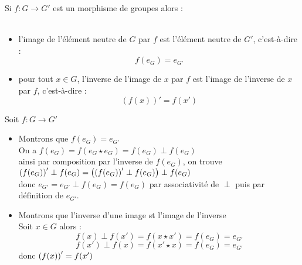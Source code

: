 \begin{prop}
    Si \(f : G \to G'\) est un morphisme de groupes alors :\\~\\
    \begin{itemize}
        \item l’image de l’élément neutre de \(G\) par \(f\) est l’élément neutre de \(G'\), c’est-à-dire :
            \[f (e_G) = e_{G'} \]
        \item pour tout \(x \in G\), l’inverse de l’image de \(x\) par \(f\) est l’image de l’inverse de \(x\) par \(f\), c’est-à-dire :
            \[(f (x))' = f (x')\]
    \end{itemize}
\end{prop}

\begin{dem}
    Soit \(f : G \to G'\)
    \begin{itemize}
        \item Montrons que  \(f(e_G) = e_{G'} \)\\
        On a \(f(e_G) = f(e_G \star e_G) = f(e_G) \perp f(e_G)\)\\ 
        ainsi par composition par l'inverse de \(f(e_G)\), on trouve \(\left(f(e_G)\right)' \perp f(e_G) = \left(\left(f(e_G)\right)' \perp f(e_G)\right) \perp f(e_G)\)\\ 
        donc \(e_{G'} = e_{G'} \perp f(e_G) = f(e_G)\) par associativité de \(\perp\) puis par définition de \(e_{G'}\).
        \item Montrons que l'inverse d'une image st l'image de l'inverse \\
        Soit \(x \in G\) alors : 
        \[f(x) \perp f(x') = f(x \star x') = f(e_G) = e_{G'}\]
        \[f(x') \perp f(x) = f(x' \star x) = f(e_G) = e_{G'}\]
        donc \(\left(f(x)\right)' = f(x')\)
    \end{itemize}
\end{dem}


